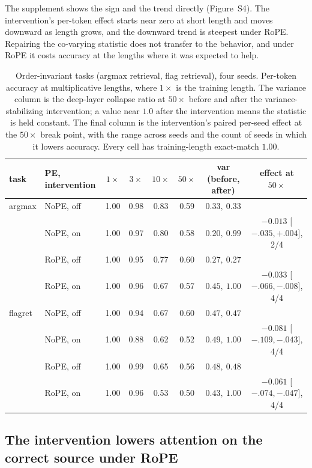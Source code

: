 \documentclass[letterpaper]{article} %
\begin{document}
The supplement shows the sign and the trend directly (Figure~S4).
The intervention's per-token effect starts near zero at short length and moves downward as length grows,
and the downward trend is steepest under RoPE.
Repairing the co-varying statistic does not transfer to the behavior, and under RoPE it costs accuracy at
the lengths where it was expected to help.

\begin{table}[t]
\centering\small
\caption{Order-invariant tasks (argmax retrieval, flag retrieval), four seeds.
Per-token accuracy at multiplicative lengths, where $1\times$ is the training length.
The variance column is the deep-layer collapse ratio at $50\times$ before and after the variance-stabilizing
intervention; a value near $1.0$ after the intervention means the statistic is held constant.
The final column is the intervention's paired per-seed effect at the $50\times$ break point, with the range
across seeds and the count of seeds in which it lowers accuracy.
Every cell has training-length exact-match $1.00$.}
\label{tab:main}
\begin{tabular}{llcccc c c}
\toprule
task & PE, intervention & $1\times$ & $3\times$ & $10\times$ & $50\times$ & var (before, after) & effect at $50\times$ \\
\midrule
argmax  & NoPE, off & 1.00 & 0.98 & 0.83 & 0.59 & $0.33,\ 0.33$ & \\
        & NoPE, on  & 1.00 & 0.97 & 0.80 & 0.58 & $0.20,\ 0.99$ & $-0.013$ [$-.035,+.004$], 2/4\\
        & RoPE, off & 1.00 & 0.95 & 0.77 & 0.60 & $0.27,\ 0.27$ & \\
        & RoPE, on  & 1.00 & 0.96 & 0.67 & 0.57 & $0.45,\ 1.00$ & $-0.033$ [$-.066,-.008$], 4/4\\
\midrule
flagret & NoPE, off & 1.00 & 0.94 & 0.67 & 0.60 & $0.47,\ 0.47$ & \\
        & NoPE, on  & 1.00 & 0.88 & 0.62 & 0.52 & $0.49,\ 1.00$ & $-0.081$ [$-.109,-.043$], 4/4\\
        & RoPE, off & 1.00 & 0.99 & 0.65 & 0.56 & $0.48,\ 0.48$ & \\
        & RoPE, on  & 1.00 & 0.96 & 0.53 & 0.50 & $0.43,\ 1.00$ & $-0.061$ [$-.074,-.047$], 4/4\\
\bottomrule
\end{tabular}
\end{table}

\subsection{The intervention lowers attention on the correct source under RoPE}
\label{sec:res-attnfix}
\end{document}
